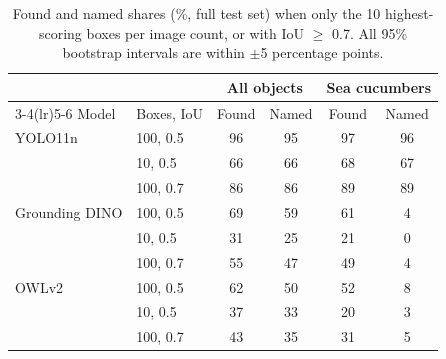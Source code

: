 \begin{table}[!ht]
\centering
\small
\setlength{\tabcolsep}{2.8pt}
\begin{tabular}{llcccc}
\toprule
 & & \multicolumn{2}{c}{All objects} & \multicolumn{2}{c}{Sea cucumbers} \\
\cmidrule(lr){3-4}\cmidrule(lr){5-6}
Model & Boxes, IoU & Found & Named & Found & Named \\
\midrule
YOLO11n & 100, 0.5 & 96 & 95 & 97 & 96 \\
 & 10, 0.5 & 66 & 66 & 68 & 67 \\
 & 100, 0.7 & 86 & 86 & 89 & 89 \\
Grounding DINO & 100, 0.5 & 69 & 59 & 61 & 4 \\
 & 10, 0.5 & 31 & 25 & 21 & 0 \\
 & 100, 0.7 & 55 & 47 & 49 & 4 \\
OWLv2 & 100, 0.5 & 62 & 50 & 52 & 8 \\
 & 10, 0.5 & 37 & 33 & 20 & 3 \\
 & 100, 0.7 & 43 & 35 & 31 & 5 \\
\bottomrule
\end{tabular}
\caption{Found and named shares (\%, full test set) when only the 10 highest-scoring boxes per image count, or with IoU $\geq$ 0.7. All 95\% bootstrap intervals are within $\pm$5 percentage points.}
\label{tab:sensitivity}
\end{table}
